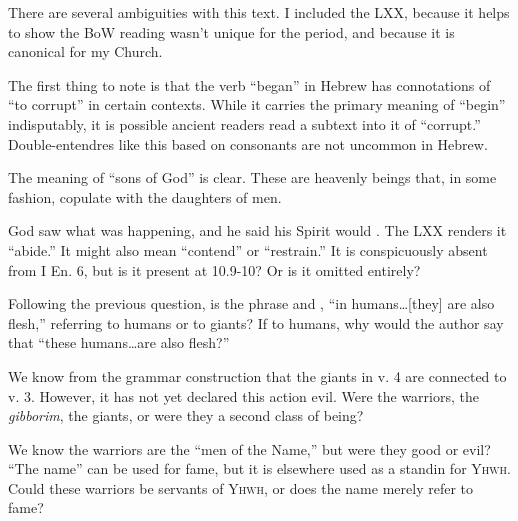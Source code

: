 \documentclass{beamer}
\begin{document}
\begin{frame}
  There are several ambiguities with this text.
  I included the LXX, because it helps to show the BoW reading wasn't unique for the period, and because it is canonical for my Church.
\end{frame}

\begin{frame}
  The first thing to note is that the verb ``began'' in Hebrew has connotations of ``to corrupt'' in certain contexts.
  While it carries the primary meaning of ``begin'' indisputably, it is possible ancient readers read a subtext into it of ``corrupt.''
  Double-entendres like this based on consonants are not uncommon in Hebrew.
\end{frame}

\begin{frame}
  The meaning of ``sons of God'' is clear.
  These are heavenly beings that, in some fashion, copulate with the daughters of men.
\end{frame}

\begin{frame}
  God saw what was happening, and he said his Spirit would .
  The LXX renders it ``abide.''
  It might also mean ``contend'' or ``restrain.''
  It is conspicuously absent from I En. 6, but is it present at 10.9-10?
  Or is it omitted entirely?
\end{frame}

\begin{frame}
  Following the previous question, is the phrase  and , ``in humans\ldots [they] are also flesh,'' referring to humans or to giants?
  If to humans, why would the author say that ``these humans\ldots are also flesh?''
\end{frame}

\begin{frame}
  We know from the grammar construction that the giants in v. 4 are connected to v. 3.
  However, it has not yet declared this action evil.
  Were the warriors, the \emph{gibborim}, the giants, or were they a second class of being?
\end{frame}

\begin{frame}
  We know the warriors are the ``men of the Name,'' but were they good or evil?
  ``The name'' can be used for fame, but it is elsewhere used as a standin for \textsc{Yhwh}.
  Could these warriors be servants of \textsc{Yhwh}, or does the name merely refer to fame?
\end{frame}
\end{document}
